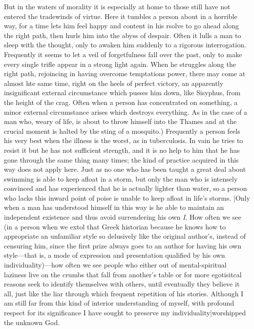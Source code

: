  But in the waters of morality it is especially at home to those still have not entered the tradewinds of virtue. 
 Here it tumbles a person about in a horrible way, for a time lets him feel happy and content in his rsolve to go ahead along the right path, then hurls him into the abyss of despair. 
 Often it lulls a man to sleep with the thought,  only to awaken him suddenly to a rigorous interrogation. 
 Frequently it seems to let a veil of forgetfulness fall over the past, only to make every single trifle appear in a strong light again. 
 When he struggles along the right path, rejoincing in having overcome temptations power, there may come at almost hte same time, right on the heels of perfect victory, an apparently insignificant external circumstance which pusses him down, like Sisyphus, from the height of the crag. 
 Often when a person has concentrated on something, a minor external circumstance arises which destroys everything. 
 As in the case of a man who, weary of life, is about to throw himself into the Thames and at the crucial moment is halted by the sting of a mosquito.) 
 Frequently a person feels his very best when the illness is the worst, as in tuberculosis. 
 In vain he tries to resist it but he has not sufficient strength, and it is no help to him that he has gone through the same thing many times; the kind of practice acquired in this way does not apply here. 
 Just as no one who has been taught a great deal about swimming is able to keep afloat in a storm, but only the man who is intensely convinced and has experienced that he is actually lighter than water, so a person who lacks this inward point of poise is unable to keep afloat in life's storms. 
 |Only when a man has understood himself in this way is he able to maintain an independent existence and thus avoid surrendering his own \textit{I}. 
 How often we see (in a person when we extol that Greek historian because he knows how to appropriate an unfamiliar style so delusively like the original author's, instead of censuring him, since the first prize always goes to an author for having his own style---that is, a mode of expression and presentation qualified by his own individuality)---how often we see people who either out of mental-spiritual laziness live on the crumbs that fall from another's table or for more egotisitcal reasons seek to identify themselves with others, until eventually they believe it all, just like the liar through which frequent repetition of his stories. 
 Although I am still far from this kind of interior understanding of myself, with profound respect for its significance I have sought to preserve my individuality|worshipped the unknown God. 
